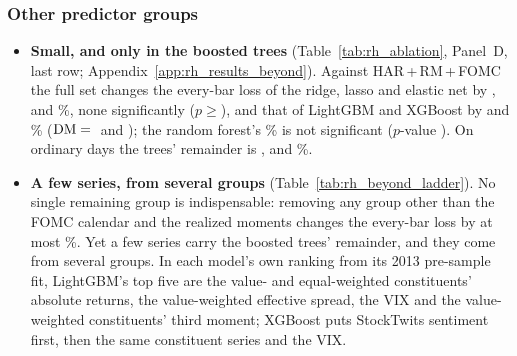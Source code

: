\subsubsection{Other predictor groups}
\label{sec:rh_fi_rest}
\label{sec:rh_results_beyond}
\begin{itemize}
\item \textbf{Small, and only in the boosted trees} (Table~\ref{tab:rh_ablation}, Panel~D, last row;
  Appendix~\ref{app:rh_results_beyond}). Against HAR\,+\,RM\,+\,FOMC the full set changes the every-bar loss of the
  ridge, lasso and elastic net by \rhabRidgeFullVsAddRmFomcAllPct, \rhabLassoFullVsAddRmFomcAllPct{} and
  \rhabEnetFullVsAddRmFomcAllPct\%, none significantly ($p \geq{}$\rhabLinFullVsAddRmFomcAllPMin), and that of
  LightGBM and XGBoost by \rhabLgbmFullVsAddRmFomcAllPct{} and \rhabXgbFullVsAddRmFomcAllPct\%
  ($\mathrm{DM}={}$\rhabLgbmFullVsAddRmFomcAllDm{} and \rhabXgbFullVsAddRmFomcAllDm); the random forest's
  \rhabRfFullVsAddRmFomcAllPct\% is not significant ($p$-value \rhabRfFullVsAddRmFomcAllP). On ordinary days the trees'
  remainder is \rhabLgbmFullVsAddRmFomcOrdPct, \rhabXgbFullVsAddRmFomcOrdPct{} and \rhabRfFullVsAddRmFomcOrdPct\%.
\item \textbf{A few series, from several groups} (Table~\ref{tab:rh_beyond_ladder}). No single remaining group is
  indispensable: removing any group other than the FOMC calendar and the realized moments changes the every-bar loss
  by at most \rhabLoOtherAllMaxAbs\%. Yet a few series carry the boosted trees' remainder, and they come from several
  groups. In each model's own ranking from its 2013 pre-sample fit, LightGBM's top five are the value- and
  equal-weighted constituents' absolute returns, the value-weighted effective spread, the VIX and the value-weighted
  constituents' third moment; XGBoost puts StockTwits sentiment first, then the same constituent series and the VIX.

\end{itemize}
